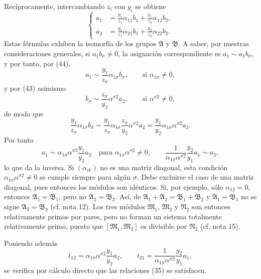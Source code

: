 \documentclass[11pt]{article}
\begin{document}
Recíprocamente, intercambiando $z_i$ con $y_i$ se obtiene
\begin{equation}
\left\{
\begin{aligned}
 a_1&=\frac{y_1}{z_1}\alpha_{11}b_1+\frac{y_1}{z_2}\alpha_{12}b_2,\\
 a_2&=\frac{y_2}{z_1}\alpha_{21}b_1+\frac{y_2}{z_2}\alpha_{22}b_2.
\end{aligned}\right.
\tag{44}
\end{equation}
Estas fórmulas exhiben la isomorfía de los grupos $\mathfrak A$ y $\mathfrak B$. A saber, por nuestras consideraciones generales, si $a_1b_\sigma\ne0$, la asignación correspondiente es $a_1\sim a_1b_\sigma$, y por tanto, por (44),
\[
 a_1\sim\frac{y_1}{z_\sigma}\alpha_{1\sigma}b_\sigma,
 \qquad\text{si }\alpha_{1\sigma}\ne0,
\]
y por (43) asimismo
\[
 b_\sigma\sim\frac{z_\sigma}{y_2}\alpha^{\sigma2}a_2,
 \qquad\text{si }\alpha^{\sigma2}\ne0,
\]
de modo que
\[
 \frac{y_1}{z_\sigma}\alpha_{1\sigma}b_\sigma
 \sim
 \frac{y_1}{z_\sigma}\alpha_{1\sigma}\frac{z_\sigma}{y_2}\alpha^{\sigma2}a_2
 =\frac{y_1}{y_2}\alpha_{1\sigma}\alpha^{\sigma2}a_2.
\]
Por tanto
\[
 a_1\sim\alpha_{1\sigma}\alpha^{\sigma2}\frac{y_1}{y_2}a_2
 \quad\text{para }\alpha_{1\sigma}\alpha^{\sigma2}\ne0,
 \qquad
 \frac{1}{\alpha_{1\sigma}\alpha^{\sigma2}}\frac{y_2}{y_1}a_1\sim a_2,
\]
lo que da la inversa. Si $(\alpha_{ik})$ no es una matriz diagonal, esta condición $\alpha_{1\sigma}\alpha^{\sigma2}\ne0$ se cumple siempre para algún $\sigma$. Debe excluirse el caso de una matriz diagonal, pues entonces los módulos son idénticos. Si, por ejemplo, sólo $\alpha_{12}=0$, entonces $\mathfrak A_1=\mathfrak B_1$, pero no $\mathfrak A_2=\mathfrak B_2$. Así, de $\mathfrak A_1+\mathfrak A_2=\mathfrak B_1+\mathfrak B_2$ y $\mathfrak A_1=\mathfrak B_1$ no se sigue $\mathfrak A_2=\mathfrak B_2$ (cf. nota 12). Los tres módulos $\mathfrak M_1$, $\mathfrak M_2$ y $\mathfrak N_2$ son entonces relativamente primos por pares, pero no forman un sistema totalmente relativamente primo, puesto que $[\mathfrak M_1,\mathfrak M_2]$ es divisible por $\mathfrak N_2$ (cf. nota 15).

Poniendo además
\[
 t_{12}=\alpha_{1\sigma}\alpha^{\sigma2}\frac{y_1}{y_2}a_2,
 \qquad
 t_{21}=\frac{1}{\alpha_{1\sigma}\alpha^{\sigma2}}\frac{y_2}{y_1}a_1,
\]
se verifica por cálculo directo que las relaciones (35) se satisfacen.
\end{document}
